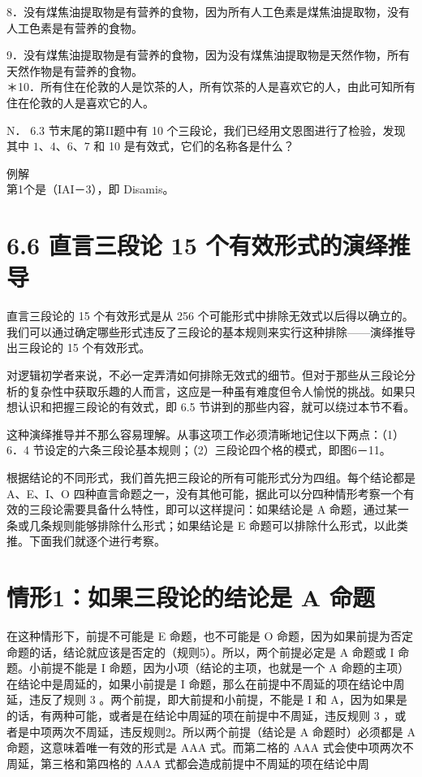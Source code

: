 8．没有煤焦油提取物是有营养的食物，因为所有人工色素是煤焦油提取物，没有人工色素是有营养的食物。

9．没有煤焦油提取物是有营养的食物，因为没有煤焦油提取物是天然作物，所有天然作物是有营养的食物。\\
＊10．所有住在伦敦的人是饮茶的人，所有饮茶的人是喜欢它的人，由此可知所有住在伦敦的人是喜欢它的人。

N． 6.3 节末尾的第II题中有 10 个三段论，我们已经用文恩图进行了检验，发现其中 $1 、 4 、 6 、 7$ 和 10 是有效式，它们的名称各是什么？

例解\\
第1个是（IAI－3），即 Disamis。

\section*{6.6 直言三段论 15 个有效形式的演绎推导}
直言三段论的 15 个有效形式是从 256 个可能形式中排除无效式以后得以确立的。我们可以通过确定哪些形式违反了三段论的基本规则来实行这种排除——演绎推导出三段论的 15 个有效形式。

对逻辑初学者来说，不必一定弄清如何排除无效式的细节。但对于那些从三段论分析的复杂性中获取乐趣的人而言，这应是一种虽有难度但令人愉悦的挑战。如果只想认识和把握三段论的有效式，即 6.5 节讲到的那些内容，就可以绕过本节不看。

这种演绎推导并不那么容易理解。从事这项工作必须清晰地记住以下两点：（1）6．4 节设定的六条三段论基本规则；（2）三段论四个格的模式，即图6－11。

根据结论的不同形式，我们首先把三段论的所有可能形式分为四组。每个结论都是 A、E、I、O 四种直言命题之一，没有其他可能，据此可以分四种情形考察一个有效的三段论需要具备什么特性，即可以这样提问：如果结论是 A 命题，通过某一条或几条规则能够排除什么形式；如果结论是 E 命题可以排除什么形式，以此类推。下面我们就逐个进行考察。

\section*{情形1：如果三段论的结论是 $\mathbf{A}$ 命题}
在这种情形下，前提不可能是 E 命题，也不可能是 O 命题，因为如果前提为否定命题的话，结论就应该是否定的（规则5）。所以，两个前提必定是 A 命题或 I 命题。小前提不能是 I 命题，因为小项（结论的主项，也就是一个 A 命题的主项）在结论中是周延的，如果小前提是 I 命题，那么在前提中不周延的项在结论中周延，违反了规则 3 。两个前提，即大前提和小前提，不能是 I 和 A，因为如果是的话，有两种可能，或者是在结论中周延的项在前提中不周延，违反规则 3 ，或者是中项两次不周延，违反规则2。所以两个前提（结论是 A 命题时）必须都是 A 命题，这意味着唯一有效的形式是 AAA 式。而第二格的 AAA 式会使中项两次不周延，第三格和第四格的 AAA 式都会造成前提中不周延的项在结论中周

